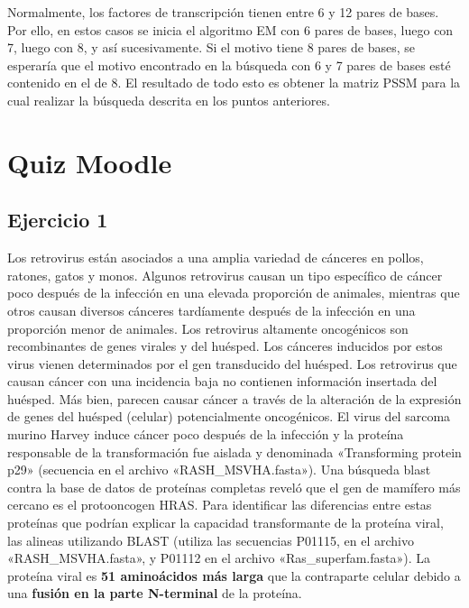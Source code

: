 Normalmente, los factores de transcripción tienen entre 6 y 12 pares de bases. Por ello, en estos casos se inicia el algoritmo EM con 6 pares de bases, luego con 7, luego con 8, y así sucesivamente. Si el motivo tiene 8 pares de bases, se esperaría que el motivo encontrado en la búsqueda con 6 y 7 pares de bases esté contenido en el de 8. El resultado de todo esto es obtener la matriz PSSM para la cual realizar la búsqueda descrita en los puntos anteriores. 

\section{Quiz Moodle}
\subsection{Ejercicio 1}
Los retrovirus están asociados a una amplia variedad de cánceres en pollos, ratones, gatos y monos. Algunos retrovirus causan un tipo específico de cáncer poco después de la infección en una elevada proporción de animales, mientras que otros causan diversos cánceres tardíamente después de la infección en una proporción menor de animales.
Los retrovirus altamente oncogénicos son recombinantes de genes virales y del huésped. Los cánceres inducidos por estos virus vienen determinados por el gen transducido del huésped.
Los retrovirus que causan cáncer con una incidencia baja no contienen información insertada del huésped. Más bien, parecen causar cáncer a través de la alteración de la expresión de genes del huésped (celular) potencialmente oncogénicos.
El virus del sarcoma murino Harvey induce cáncer poco después de la infección y la proteína responsable de la transformación fue aislada y denominada «Transforming protein p29» (secuencia en el archivo «RASH\_MSVHA.fasta»). Una búsqueda blast contra la base de datos de proteínas completas reveló que el gen de mamífero más cercano es el protooncogen HRAS. Para identificar las diferencias entre estas proteínas que podrían explicar la capacidad transformante de la proteína viral, las alineas utilizando BLAST (utiliza las secuencias P01115, en el archivo «RASH\_MSVHA.fasta», y P01112 en el archivo «Ras\_superfam.fasta»). La proteína viral es \textbf{51 aminoácidos más larga} que la contraparte celular debido a una \textbf{fusión en la parte N-terminal} de la proteína. 

